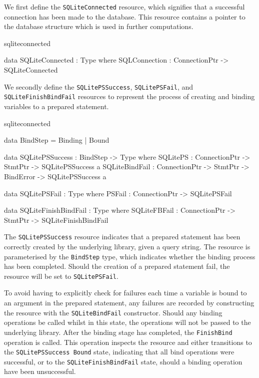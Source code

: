 We first define the \texttt{SQLiteConnected} resource, which signifies that a successful connection has been made to the database. This resource contains a pointer to the database structure which is used in further computations.

\begin{SaveVerbatim}{sqliteconnected}

data SQLiteConnected : Type where
  SQLConnection : ConnectionPtr -> SQLiteConnected
  
\end{SaveVerbatim}  

\noindent
We secondly define the \texttt{SQLitePSSuccess}, \texttt{SQLitePSFail}, and \texttt{SQLiteFinishBindFail} resources to represent the process of creating and binding variables to a prepared statement.

\begin{SaveVerbatim}{sqliteconnected}

data BindStep = Binding | Bound

data SQLitePSSuccess : BindStep -> Type where
  SQLitePS       : ConnectionPtr -> 
                   StmtPtr -> SQLitePSSuccess a
  SQLiteBindFail : ConnectionPtr -> 
                   StmtPtr -> 
                   BindError -> SQLitePSSuccess a


data SQLitePSFail : Type where
  PSFail : ConnectionPtr -> SQLitePSFail

data SQLiteFinishBindFail : Type where
  SQLiteFBFail : ConnectionPtr -> StmtPtr -> 
                 SQLiteFinishBindFail
                 
\end{SaveVerbatim}

\noindent
The \texttt{SQLitePSSuccess} resource indicates that a prepared statement has been correctly created by the underlying library, given a query string. The resource is parameterised by the \texttt{BindStep} type, which indicates whether the binding process has been completed. Should the creation of a prepared statement fail, the resource will be set to \texttt{SQLitePSFail}. 

To avoid having to explicitly check for failures each time a variable is bound to an argument in the prepared statement, any failures are recorded by constructing the resource with the \texttt{SQLiteBindFail} constructor. Should any binding operations be called whilst in this state, the operations will not be passed to the underlying library. After the binding stage has completed, the \texttt{FinishBind} operation is called. This operation inspects the resource and either transitions to the \texttt{SQLitePSSuccess Bound} state, indicating that all bind operations were successful, or to the \texttt{SQLiteFinishBindFail} state, should a binding operation have been unsuccessful. 


